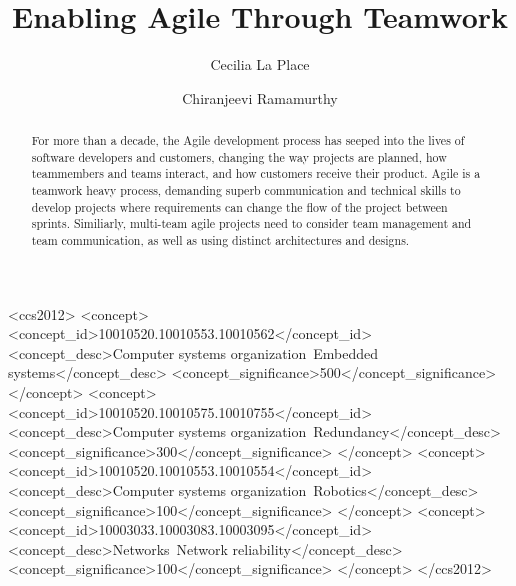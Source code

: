\documentclass[sigplan,screen]{acmart}
\begin{document}
%
\title{Enabling Agile Through Teamwork}

%
\author{Cecilia La Place}
\author{Chiranjeevi Ramamurthy}
\authornotemark[1]

%
\renewcommand{\shortauthors}{La Place and Ramamurthy}

%
\begin{abstract}
For more than a decade, the Agile development process has seeped into the lives of software developers and customers, changing the way projects are planned, how teammembers and teams interact, and how customers receive their product. Agile is a teamwork heavy process, demanding superb communication and technical skills to develop projects where requirements can change the flow of the project between sprints. Similiarly, multi-team agile projects need to consider team management and team communication, as well as using distinct architectures and designs. 
\end{abstract}

%
%
\begin{CCSXML}
<ccs2012>
 <concept>
  <concept_id>10010520.10010553.10010562</concept_id>
  <concept_desc>Computer systems organization~Embedded systems</concept_desc>
  <concept_significance>500</concept_significance>
 </concept>
 <concept>
  <concept_id>10010520.10010575.10010755</concept_id>
  <concept_desc>Computer systems organization~Redundancy</concept_desc>
  <concept_significance>300</concept_significance>
 </concept>
 <concept>
  <concept_id>10010520.10010553.10010554</concept_id>
  <concept_desc>Computer systems organization~Robotics</concept_desc>
  <concept_significance>100</concept_significance>
 </concept>
 <concept>
  <concept_id>10003033.10003083.10003095</concept_id>
  <concept_desc>Networks~Network reliability</concept_desc>
  <concept_significance>100</concept_significance>
 </concept>
</ccs2012>
\end{CCSXML}
\end{document}
